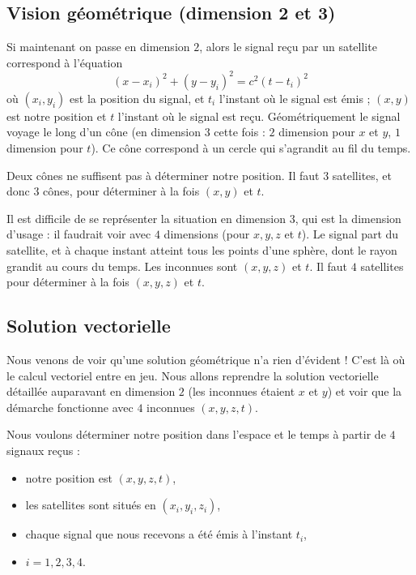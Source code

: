 \documentclass[class=report,crop=false]{standalone}
\begin{document}
\subsection{Vision géométrique (dimension 2 et 3)}
Si maintenant on passe en dimension $2$, alors le signal reçu par un satellite correspond à l'équation
$$(x-x_i)^2+(y-y_i)^2 = c^2 (t-t_i)^2$$
où $(x_i,y_i)$ est la position du signal,
et $t_i$ l'instant où le signal est émis ;
$(x,y)$ est notre position et $t$ l'instant où le signal est reçu.
Géométriquement le signal voyage le long d'un cône (en dimension $3$ cette fois : $2$ dimension pour $x$ et $y$,
$1$ dimension pour $t$).
Ce cône correspond à un cercle qui s'agrandit au fil du temps.




Deux cônes ne suffisent pas à déterminer notre position. 
Il faut $3$ satellites, et donc $3$ cônes, pour déterminer à la fois $(x,y)$ et $t$.

\bigskip

Il est difficile de se représenter la situation en dimension $3$, qui est la dimension d'usage :
il faudrait \og voir \fg{} avec $4$ dimensions (pour $x,y,z$ et $t$). 
Le signal part du satellite, et à chaque instant 
atteint tous les points d'une sphère, dont le rayon grandit au cours du temps.
Les inconnues sont $(x,y,z)$ et $t$. 
Il faut $4$ satellites pour déterminer à la fois $(x,y,z)$ et $t$.




\subsection{Solution vectorielle}


Nous venons de voir qu'une solution géométrique n'a rien d'évident ! C'est là où le
calcul vectoriel entre en jeu. Nous allons reprendre la solution vectorielle détaillée auparavant 
en dimension $2$ (les inconnues étaient $x$ et $y$) et voir que la démarche fonctionne avec $4$ inconnues
$(x,y,z,t)$.

Nous voulons déterminer notre position dans l'espace et le temps
à partir de $4$ signaux reçus  :
\begin{itemize}
  \item notre position est $(x,y,z,t)$,
  \item les satellites sont situés en $(x_i,y_i,z_i)$,
  \item chaque signal que nous recevons a été émis à l'instant $t_i$,
  \item $i=1,2,3,4$.
\end{itemize}
\end{document}
